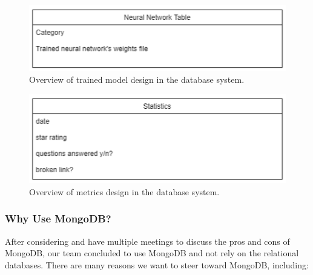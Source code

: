 \documentclass[titlepage, 12pt]{article}
\begin{document}
\begin{figure}[h]
    \centering\includegraphics[width=0.75\linewidth]{images/system-design/data-nn.png}
    \caption{Overview of trained model design in the database system.}
\end{figure}

\begin{figure}[h]
    \centering\includegraphics[width=0.75\linewidth]{images/system-design/data-statistics.png}
    \caption{Overview of metrics design in the database system.}
\end{figure}



\subsubsection{Why Use MongoDB?}

After considering and have multiple meetings to discuss the pros and cons of MongoDB, our team concluded to use MongoDB and not rely on the relational databases. There are many reasons we want to steer toward MongoDB, including:
\end{document}
